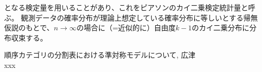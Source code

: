 \documentclass[10pt, a4paper]{ltjsarticle}
\begin{document}
となる検定量を用いることがあり、これをピアソンのカイ二乗検定統計量と呼ぶ。
観測データの確率分布が理論上想定している確率分布に等しいとする帰無仮説のもとで、$n\to\infty$の場合に（=近似的に）自由度$k-1$のカイ二乗分布に分布収束する。



\begin{thebibliography}{99}
    順序カテゴリの分割表における準対称モデルについて, 広津 \\
   xxx 
\end{thebibliography}
\end{document}
